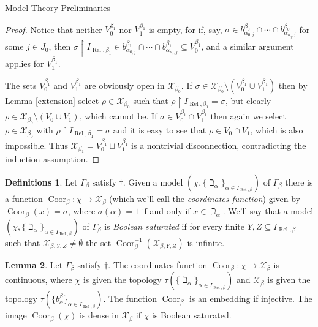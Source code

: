 \documentclass{amsart}
\theoremstyle{definition}\newtheorem{theorem}{Theorem}
\theoremstyle{definition}\newtheorem{bigtheorem}{Theorem}
\numberwithin{theorem}{section}
\theoremstyle{definition}\newtheorem{corollary}[theorem]{Corollary}
\theoremstyle{definition}\newtheorem{proposition}[theorem]{Proposition}
\theoremstyle{definition}\newtheorem{definition}[theorem]{Definition}
\theoremstyle{definition}\newtheorem{question}[theorem]{Question}
\theoremstyle{definition}\newtheorem{example}[theorem]{Example}
\theoremstyle{definition}\newtheorem{remark}[theorem]{Remark}
\theoremstyle{definition}\newtheorem{note}[theorem]{Note}
\theoremstyle{definition}\newtheorem{lemma}[theorem]{Lemma}
\theoremstyle{definition}\newtheorem{fact}[theorem]{Fact}
\theoremstyle{definition}\newtheorem{define}[theorem]{Definition}
\theoremstyle{definition}\newtheorem{definitions}[theorem]{Definitions}
\theoremstyle{definition}\newtheorem{claim}[theorem]{Claim}
\theoremstyle{definition}\newtheorem{obs}[theorem]{Observation}
\theoremstyle{definition}\newtheorem{construction}[theorem]{Construction}
\newcommand{\Rel}{\operatorname{Rel}}
\newcommand{\X}{\mathcal{X}}
\newcommand{\Coor}{\operatorname{Coor}}
\begin{document}
\begin{section}{Model Theory Preliminaries}
\begin{proof}
Notice that neither $V_0^{\beta_1}$ nor $V_1^{\beta_1}$ is empty, for if, say, $\sigma \in b_{\alpha_{0, j}}^{\beta_0} \cap \cdots \cap b_{\alpha_{n_j, j}}^{\beta_0}$ for some $j \in J_0$, then $\sigma \upharpoonright I_{\Rel, \beta_1} \in b_{\alpha_{0, j}}^{\beta_1} \cap \cdots \cap b_{\alpha_{n_j, j}}^{\beta_1} \subseteq V_0^{\beta_1}$, and a similar argument applies for $V_1^{\beta_1}$.  

The sets $V_0^{\beta_1}$ and $V_1^{\beta_1}$ are obviously open in $\X_{\beta_0}$.  If $\sigma \in \X_{\beta_0} \setminus (V_0^{\beta_1} \cup V_1^{\beta_1})$ then by Lemma \ref{extension} select $\rho \in \X_{\beta_0}$ such that $\rho \upharpoonright I_{\Rel, \beta_1} = \sigma$, but clearly $\rho \in \X_{\beta_0}\setminus (V_0 \cup V_1)$, which cannot be.  If $\sigma \in V_0^{\beta_1} \cap V_1^{\beta_1}$ then again we select $\rho \in \X_{\beta_0}$ with $\rho \upharpoonright I_{\Rel, \beta_1} = \sigma$ and it is easy to see that $\rho \in V_0 \cap V_1$, which is also impossible.  Thus $\X_{\beta_1} = V_0^{\beta_1} \sqcup V_1^{\beta_1}$ is a nontrivial disconnection, contradicting the induction assumption.
\end{proof}

\begin{definitions}  Let $\Gamma_{\beta}$ satisfy $\dagger$.  Given a model $(\chi, \{\beth_{\alpha}\}_{\alpha \in I_{\Rel, \beta}})$ of $\Gamma_{\beta}$ there is a function $\Coor_{\beta}: \chi \rightarrow \X_{\beta}$ (which we'll call the \textit{coordinates function}) given by $\Coor_{\beta}(x) = \sigma$, where $\sigma(\alpha) = 1$ if and only if $x\in \beth_{\alpha}$.  We'll say that a model $(\chi, \{\beth_{\alpha}\}_{\alpha \in I_{\Rel, \beta}})$ of $\Gamma_{\beta}$ is \textit{Boolean saturated} if for every finite $Y, Z \subseteq I_{\Rel, \beta}$ such that $\X_{\beta, Y, Z} \neq \emptyset$ the set $\Coor_{\beta}^{-1}(\X_{\beta, Y, Z})$ is infinite.
\end{definitions}

\begin{lemma} \label{coord}  Let $\Gamma_{\beta}$ satisfy $\dagger$.  The coordinates function $\Coor_{\beta}: \chi \rightarrow \X_{\beta}$ is continuous, where $\chi$ is given the topology $\tau(\{\beth_{\alpha}\}_{\alpha \in I_{\Rel, \beta}})$ and $\X_{\beta}$ is given the topology $\tau(\{b_{\alpha}^{\beta}\}_{\alpha \in I_{\Rel, \beta}})$.  The function $\Coor_{\beta}$ is an embedding if injective.  The image $\Coor_{\beta}(\chi)$ is dense in $\X_{\beta}$ if $\chi$ is Boolean saturated.
\end{lemma}


\end{section}
\end{document}
